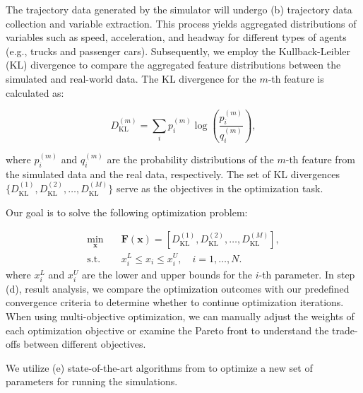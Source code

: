 The trajectory data generated by the simulator will undergo (b) trajectory data collection and variable extraction. This process yields aggregated distributions of variables such as speed, acceleration, and headway for different types of agents (e.g., trucks and passenger cars). Subsequently, we employ the Kullback-Leibler (KL) divergence to compare the aggregated feature distributions between the simulated and real-world data. The KL divergence for the $m$-th feature is calculated as:

\begin{equation}
D_{\mathrm{KL}}^{(m)} = \sum_{i} p_i^{(m)} \log \left( \frac{p_i^{(m)}}{q_i^{(m)}} \right),
\end{equation}

where $p_i^{(m)}$ and $q_i^{(m)}$ are the probability distributions of the $m$-th feature from the simulated data and the real data, respectively. The set of KL divergences $\{ D_{\mathrm{KL}}^{(1)}, D_{\mathrm{KL}}^{(2)}, \ldots, D_{\mathrm{KL}}^{(M)} \}$ serve as the objectives in the optimization task.

Our goal is to solve the following optimization problem:

\begin{equation}
\begin{aligned}
\min_{\mathbf{x}} \quad & \mathbf{F}(\mathbf{x}) = [D_{\mathrm{KL}}^{(1)}, D_{\mathrm{KL}}^{(2)}, \ldots, D_{\mathrm{KL}}^{(M)}], \\
\text{s.t.} \quad & x_i^{L} \leq x_i \leq x_i^{U}, \quad i = 1, \ldots, N.
\end{aligned}
\end{equation}
where $x_i^{L}$ and $x_i^{U}$ are the lower and upper bounds for the $i$-th parameter.
In step (d), result analysis, we compare the optimization outcomes with our predefined convergence criteria to determine whether to continue optimization iterations. When using multi-objective optimization, we can manually adjust the weights of each optimization objective or examine the Pareto front to understand the trade-offs between different objectives.

We utilize (e) state-of-the-art algorithms from\cite{bsy}\cite{pymoo} to optimize a new set of parameters for running the simulations.





